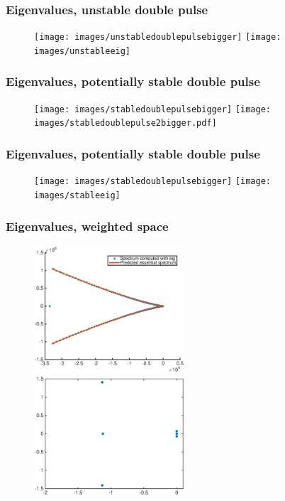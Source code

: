 \documentclass[16pt]{beamer}
\begin{document}
\begin{frame}
	\frametitle{Eigenvalues, unstable double pulse}
	\fontsize{16}{7.2}\selectfont
	\begin{figure}
   		\texttt{[image: images/unstabledoublepulsebigger]}
   		\hfill
   		\texttt{[image: images/unstableeig]}
	\end{figure}
\end{frame}

\begin{frame}
	\frametitle{Eigenvalues, potentially stable double pulse}
	\fontsize{16}{7.2}\selectfont
	\begin{figure}
   		\texttt{[image: images/stabledoublepulsebigger]}
   		\hfill
   		\texttt{[image: images/stabledoublepulse2bigger.pdf]}
	\end{figure}
\end{frame}

\begin{frame}
	\frametitle{Eigenvalues, potentially stable double pulse}
	\fontsize{16}{7.2}\selectfont
	\begin{figure}
   		\texttt{[image: images/stabledoublepulsebigger]}
   		\hfill
   		\texttt{[image: images/stableeig]}
	\end{figure}
\end{frame}

\begin{frame}
	\frametitle{Eigenvalues, weighted space}
	\fontsize{16}{7.2}\selectfont
	\begin{figure}
   		\includegraphics[width=0.5\textwidth]{images/stableeigweighted1.eps}
   		\hfill
   		\includegraphics[width=0.5\textwidth]{images/stableeigweighted2.eps}
	\end{figure}
\end{frame}
\end{document}
